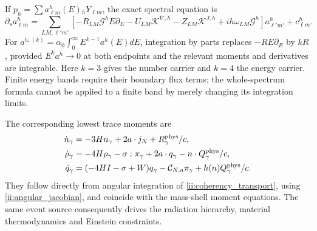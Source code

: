 If $p_h=\sum a^h_{\ell m}(E){}_hY_{\ell m}$, the exact spectral equation is
\begin{equation}
 \partial_sa^h_{\ell m}=
 \sum_{LM,\ell'm'}\left[-R_{LM}\mathcal G^hE\partial_E
 -U_{LM}\mathcal K^{\nabla,h}-Z_{LM}\mathcal K^{J,h}
 +ih\omega_{LM}\mathcal G^h\right]a^h_{\ell'm'}+c^h_{\ell m}.
 \label{ii:spectral_hierarchy}
\end{equation}
For $a^{h,(k)}=\alpha_0\int_0^\infty E^{k-1}a^h(E)dE$, integration by parts replaces $-RE\partial_E$ by $kR$, provided $E^ka^h\to0$ at both endpoints and the relevant moments and derivatives are integrable. Here $k=3$ gives the number carrier and $k=4$ the energy carrier. Finite energy bands require their boundary flux terms; the whole-spectrum formula cannot be applied to a finite band by merely changing its integration limits.

The corresponding lowest trace moments are
\begin{align}
 \dot n_\gamma&=-3Hn_\gamma+2a\cdot j_N+R_\gamma^{\rm phys}/c,\nonumber\\
 \dot\rho_\gamma&=-4H\rho_\gamma-\sigma:\pi_\gamma
                    +2a\cdot q_\gamma-n\cdot Q_\gamma^{\rm phys}/c,\nonumber\\
 \dot q_\gamma&=(-4HI-\sigma+W)q_\gamma
               -\mathcal C_{N,a}\pi_\gamma+h(n)Q_\gamma^{\rm phys}/c.
 \label{ii:radiation_moments}
\end{align}
They follow directly from angular integration of \eqref{ii:coherency_transport}, using \eqref{ii:angular_jacobian}, and coincide with the mass-shell moment equations. The same event source consequently drives the radiation hierarchy, material thermodynamics and Einstein constraints.


